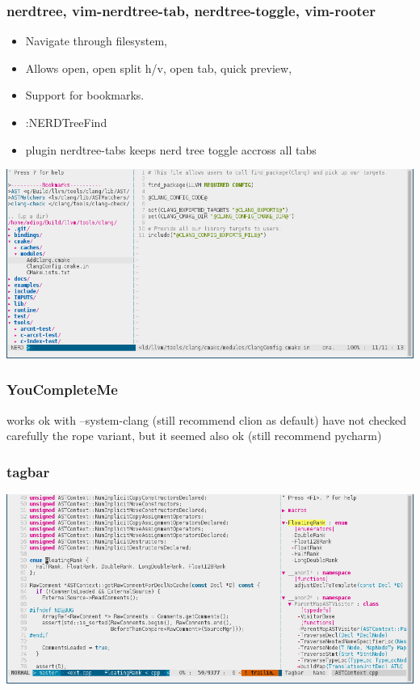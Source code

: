 \documentclass{beamer}
\begin{document}
\begin{frame}
    \frametitle{nerdtree, vim-nerdtree-tab, nerdtree-toggle, vim-rooter}
    \begin{itemize}
        \item Navigate through filesystem,
        \item Allows open, open split h/v, open tab, quick preview,
        \item Support for bookmarks.
        \item :NERDTreeFind
        \item  plugin nerdtree-tabs keeps nerd tree toggle accross all tabs
    \end{itemize}
 \includegraphics[scale=0.33]{vim_nerdtree_example.png}\\
\end{frame}

\begin{frame}
  \frametitle{YouCompleteMe}
    works ok with --system-clang (still recommend clion as default)
    have not checked carefully the rope variant, but it seemed also ok (still recommend pycharm)
\end{frame}

\begin{frame}
  \frametitle{tagbar}
 \includegraphics[scale=0.33]{vim_tagbar_example.png}\\
\end{frame}
\end{document}
